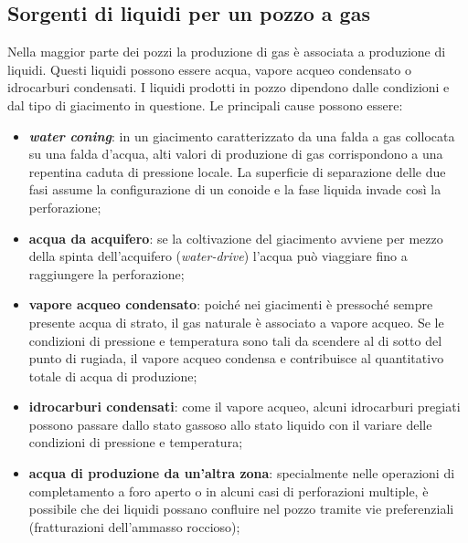 \subsection{Sorgenti di liquidi per un pozzo a gas}
Nella maggior parte dei pozzi la produzione di gas è associata a produzione di liquidi. Questi liquidi possono essere acqua, vapore acqueo condensato o idrocarburi condensati. I liquidi prodotti in pozzo dipendono dalle condizioni e dal tipo di giacimento in questione. Le principali cause possono essere:

\begin{itemize}
    \item \textbf{\textit{water coning}}: in un giacimento caratterizzato da una falda a gas collocata su una falda d'acqua, alti valori di produzione di gas corrispondono a una repentina caduta di pressione locale. La superficie di separazione delle due fasi assume la configurazione di un conoide e la fase liquida invade così la perforazione;
    \item \textbf{acqua da acquifero}: se la coltivazione del giacimento avviene per mezzo della spinta dell'acquifero (\textit{water-drive}) l'acqua può viaggiare fino a raggiungere la perforazione;
    \item \textbf{vapore acqueo condensato}: poiché nei giacimenti è pressoché sempre presente acqua di strato, il gas naturale è associato a vapore acqueo. Se le condizioni di pressione e temperatura sono tali da scendere al di sotto del punto di rugiada, il vapore acqueo condensa e contribuisce al quantitativo totale di acqua di produzione;
    \item \textbf{idrocarburi condensati}: come il vapore acqueo, alcuni idrocarburi pregiati possono passare dallo stato gassoso allo stato liquido con il variare delle condizioni di pressione e temperatura;
    \item \textbf{acqua di produzione da un'altra zona}: specialmente nelle operazioni di completamento a foro aperto o in alcuni casi di perforazioni multiple, è possibile che dei liquidi possano confluire nel pozzo tramite vie preferenziali (fratturazioni dell'ammasso roccioso);
\end{itemize}

